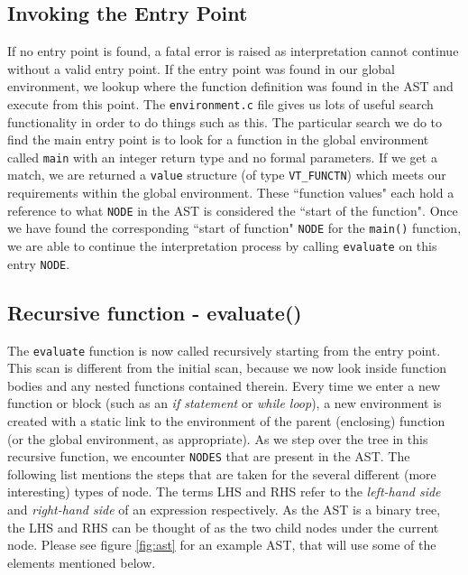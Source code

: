 \subsection{Invoking the Entry Point}
If no entry point is found, a fatal error is raised as interpretation cannot continue without a valid entry point. If the entry point was found in our global environment, we lookup where the function definition was found in the AST and execute from this point. The \verb!environment.c! file gives us lots of useful search functionality in order to do things such as this. The particular search we do to find the main entry point is to look for a function in the global environment called \verb!main! with an integer return type and no formal parameters. If we get a match, we are returned a \verb!value! structure (of type \verb!VT_FUNCTN!) which meets our requirements within the global environment. These ``function values" each hold a reference to what \verb!NODE! in the AST is considered the ``start of the function". Once we have found the corresponding ``start of function" \verb!NODE! for the \verb!main()! function, we are able to continue the interpretation process by calling \verb!evaluate! on this entry \verb!NODE!.

\subsection{Recursive function - evaluate()}
The \verb!evaluate! function is now called recursively starting from the entry point. This scan is different from the initial scan, because we now look inside function bodies and any nested functions contained therein. Every time we enter a new function or block (such as an \emph{if statement} or \emph{while loop}), a new environment is created with a static link to the environment of the parent (enclosing) function (or the global environment, as appropriate). As we step over the tree in this recursive function, we encounter \verb!NODES! that are present in the AST. The following list mentions the steps that are taken for the several different (more interesting) types of node. The terms LHS and RHS refer to the \emph{left-hand side} and \emph{right-hand side} of an expression respectively. As the AST is a binary tree, the LHS and RHS can be thought of as the two child nodes under the current node. Please see figure \ref{fig:ast} for an example AST, that will use some of the elements mentioned below.


